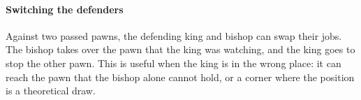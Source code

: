 
\paragraph{Switching the defenders}\label{switch-the-defender}
Against two passed pawns, the defending king and bishop can swap their jobs. The bishop takes over
the pawn that the king was watching, and the king goes to stop the other pawn. This is useful when
the king is in the wrong place: it can reach the pawn that the bishop alone cannot hold, or a
corner where the position is a theoretical draw.
